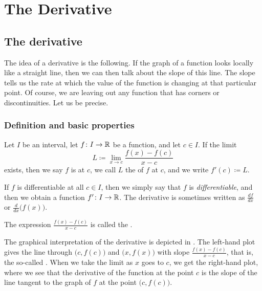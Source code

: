 \chapter{The Derivative} \label{der:chapter}


\section{The derivative}
\label{sec:der}



The idea of a derivative is the following.
If the graph of a function looks locally like a straight line,
then we can then talk about the slope of this line.
The slope tells us the rate at which 
the value of the function is changing at that particular point.
Of course, we are leaving out any function that has corners or
discontinuities.  
Let us be precise.

\subsection{Definition and basic properties}

\begin{defn}
Let $I$ be an interval, let
$f \colon I \to {\mathbb{R}}$ be a function, and let $c \in I$.  If 
the limit
\begin{equation*}
L \coloneqq \lim_{x \to c} \frac{f(x)-f(c)}{x-c} 
\end{equation*}
exists, then we say $f$ is
\emph{} at
$c$,  we call $L$ the \emph{} of $f$ at $c$,
and we write $f'(c) \coloneqq L$.

\medskip

If $f$ is differentiable at all $c \in I$, then we simply say that
$f$ is \emph{differentiable}, and then we obtain a function
$f' \colon I \to {\mathbb{R}}$.
The derivative is sometimes written as $\frac{df}{dx}$ or
$\frac{d}{dx}\bigl( f(x) \bigr)$.

\medskip

The expression $\frac{f(x)-f(c)}{x-c}$ is called the
\emph{}.
\end{defn}

The graphical interpretation of the derivative is  depicted in
.  The left-hand plot gives the line through
$\bigl(c,f(c)\bigr)$
and $\bigl(x,f(x)\bigr)$ with slope
$\frac{f(x)-f(c)}{x-c}$, that is,
the so-called \emph{}.  When we take the limit as $x$ goes to $c$,
we get the right-hand plot, where we see
that the derivative of the function
at the point $c$ is the slope of the line tangent to the graph of $f$
at the point $\bigl(c,f(c)\bigr)$.


